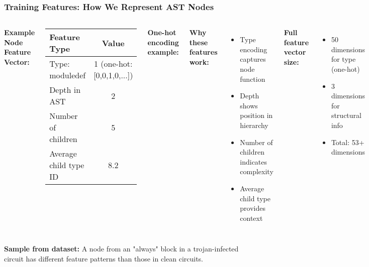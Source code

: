 \documentclass[aspectratio=169]{beamer}
\begin{document}
\begin{frame}
\frametitle{Training Features: How We Represent AST Nodes}

\begin{columns}
\textbf{Example Node Feature Vector:}
\begin{small}
\begin{tabular}{|l|c|}
\hline
\textbf{Feature Type} & \textbf{Value} \\
\hline
Type: moduledef & 1 (one-hot: [0,0,1,0,...]) \\
Depth in AST & 2 \\
Number of children & 5 \\
Average child type ID & 8.2 \\
\hline
\end{tabular}
\end{small}

\vspace{0.2cm}
\textbf{One-hot encoding example:}


\textbf{Why these features work:}
\begin{itemize}
    \item Type encoding captures node function
    \item Depth shows position in hierarchy
    \item Number of children indicates complexity
    \item Average child type provides context
\end{itemize}

\vspace{0.2cm}
\textbf{Full feature vector size:}
\begin{itemize}
    \item 50 dimensions for type (one-hot)
    \item 3 dimensions for structural info
    \item Total: 53+ dimensions
\end{itemize}
\end{columns}

\textbf{Sample from dataset:} A node from an "always" block in a trojan-infected circuit has different feature patterns than those in clean circuits.
\end{frame}
\end{document}
